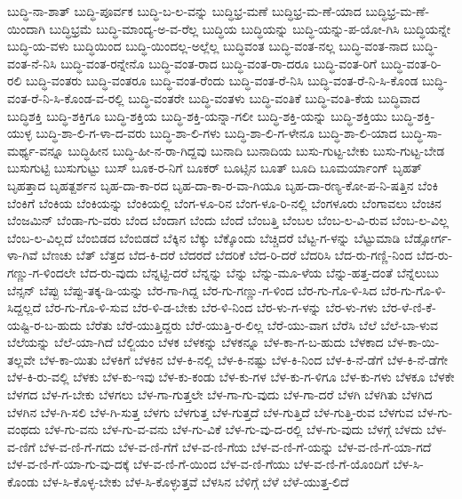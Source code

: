 {ಬುದ್ಧಿ-ನಾ-ಶಾತ್
ಬುದ್ಧಿ-ಪೂರ್ವಕ
ಬುದ್ಧಿ-ಬ-ಲ-ವನ್ನು
ಬುದ್ಧಿಭ್ರ-ಮಣೆ
ಬುದ್ಧಿಭ್ರ-ಮ-ಣೆ-ಯಾದ
ಬುದ್ಧಿಭ್ರ-ಮ-ಣೆ-ಯಿಂದಾಗಿ
ಬುದ್ಧಿಭ್ರಮೆ
ಬುದ್ಧಿ-ಮಾಂದ್ಯ-ಅ-ವ-ರೆಲ್ಲ
ಬುದ್ಧಿಯ
ಬುದ್ಧಿಯನ್ನು
ಬುದ್ಧಿ-ಯನ್ನು-ಪ-ಯೋ-ಗಿಸಿ
ಬುದ್ಧಿಯನ್ನೇ
ಬುದ್ಧಿ-ಯ-ವಳು
ಬುದ್ಧಿಯಿಂದ
ಬುದ್ಧಿ-ಯಿಂದಲ್ಲ-ಅಲ್ಲೆಲ್ಲ
ಬುದ್ಧಿವಂತ
ಬುದ್ಧಿ-ವಂತ-ನಲ್ಲ
ಬುದ್ಧಿ-ವಂತ-ನಾದ
ಬುದ್ಧಿ-ವಂತ-ನೆ-ನಿಸಿ
ಬುದ್ಧಿ-ವಂತ-ರನ್ನೇನೊ
ಬುದ್ಧಿ-ವಂತ-ರಾದ
ಬುದ್ಧಿ-ವಂತ-ರಾ-ದರೂ
ಬುದ್ಧಿ-ವಂತ-ರಿಗೆ
ಬುದ್ಧಿ-ವಂತ-ರಿ-ರಲಿ
ಬುದ್ಧಿ-ವಂತರು
ಬುದ್ಧಿ-ವಂತರೂ
ಬುದ್ಧಿ-ವಂತ-ರೆಂದು
ಬುದ್ಧಿ-ವಂತ-ರೆ-ನಿಸಿ
ಬುದ್ಧಿ-ವಂತ-ರೆ-ನಿ-ಸಿ-ಕೊಂಡ
ಬುದ್ಧಿ-ವಂತ-ರೆ-ನಿ-ಸಿ-ಕೊಂಡ-ವ-ರಲ್ಲಿ
ಬುದ್ಧಿ-ವಂತರೇ
ಬುದ್ಧಿ-ವಂತಳು
ಬುದ್ಧಿ-ವಂತಿಕೆ
ಬುದ್ಧಿ-ವಂತಿ-ಕೆಯ
ಬುದ್ಧಿವಾದ
ಬುದ್ಧಿಶಕ್ತಿ
ಬುದ್ಧಿ-ಶಕ್ತಿಗೂ
ಬುದ್ಧಿ-ಶಕ್ತಿಯ
ಬುದ್ಧಿ-ಶಕ್ತಿ-ಯನ್ನಾ-ಗಲೀ
ಬುದ್ಧಿ-ಶಕ್ತಿ-ಯನ್ನು
ಬುದ್ಧಿ-ಶಕ್ತಿಯು
ಬುದ್ಧಿ-ಶಕ್ತಿ-ಯುಳ್ಳ
ಬುದ್ಧಿ-ಶಾ-ಲಿ-ಗ-ಳಾ-ದ-ವರು
ಬುದ್ಧಿ-ಶಾ-ಲಿ-ಗಳು
ಬುದ್ಧಿ-ಶಾ-ಲಿ-ಗ-ಳೇನೂ
ಬುದ್ಧಿ-ಶಾ-ಲಿ-ಯಾದ
ಬುದ್ಧಿ-ಸಾ-ಮರ್ಥ್ಯ-ವನ್ನೂ
ಬುದ್ಧಿಹೀನ
ಬುದ್ಧಿ-ಹೀ-ನ-ರಾ-ಗಿದ್ದವು
ಬುನಾದಿ
ಬುನಾದಿಯ
ಬುಸು-ಗುಟ್ಟ-ಬೇಕು
ಬುಸು-ಗುಟ್ಟ-ಬೇಡ
ಬುಸುಗುಟ್ಟಿ
ಬುಸುಗುಟ್ಟು
ಬುಸ್
ಬೂಕ-ರ-ನಿಗೆ
ಬೂಕರ್
ಬೂಟ್ಸಿನ
ಬೂತ್
ಬೂದಿ
ಬೂಮರ್ಯಾಂಗ್
ಬೃಹತ್
ಬೃಹತ್ತಾದ
ಬೃಹತ್ದರ್ಶನ
ಬೃಹ-ದಾ-ಕಾ-ರದ
ಬೃಹ-ದಾ-ಕಾ-ರ-ವಾ-ಗಿಯೂ
ಬೃಹ-ದಾ-ರಣ್ಯ-ಕೋ-ಪ-ನಿ-ಷತ್ತಿನ
ಬೆಂಕಿ
ಬೆಂಕಿಗೆ
ಬೆಂಕಿಯ
ಬೆಂಕಿಯನ್ನು
ಬೆಂಕಿಯಲ್ಲಿ
ಬೆಂಗ-ಳೂ-ರಿನ
ಬೆಂಗ-ಳೂ-ರಿ-ನಲ್ಲಿ
ಬೆಂಗಳೂರು
ಬೆಂಗಾವಲು
ಬೆಂಚಿನ
ಬೆಂಜಮಿನ್
ಬೆಂಡಾ-ಗು-ವರು
ಬೆಂದ
ಬೆಂದಾಗ
ಬೆಂದು
ಬೆಂದೆ
ಬೆಂಬತ್ತಿ
ಬೆಂಬಲ
ಬೆಂಬ-ಲ-ವಿ-ರುವ
ಬೆಂಬ-ಲ-ವಿಲ್ಲ
ಬೆಂಬ-ಲ-ವಿಲ್ಲದೆ
ಬೆಂಬಿಡದ
ಬೆಂಬಿಡದೆ
ಬೆಕ್ಕಿನ
ಬೆಕ್ಕು
ಬೆಕ್ಕೊಂದು
ಬೆಚ್ಚಿದರೆ
ಬೆಟ್ಟ-ಗ-ಳನ್ನು
ಬೆಟ್ಟುಮಾಡಿ
ಬೆಡ್ಸೋರ್ಗ-ಳಾ-ಗಿವೆ
ಬೆಣಚು
ಬೆತ್
ಬೆತ್ತದ
ಬೆದ-ಕಿ-ದರೆ
ಬೆದರದೆ
ಬೆದರಿಕೆ
ಬೆದ-ರಿ-ದರೆ
ಬೆದರಿಸಿ
ಬೆದ-ರು-ಗಣ್ಣಿ-ನಿಂದ
ಬೆದ-ರು-ಗಣ್ಣು-ಗ-ಳಿಂದಲೇ
ಬೆದ-ರು-ವುದು
ಬೆನ್ನಟ್ಟಿ-ದರೆ
ಬೆನ್ನನ್ನು
ಬೆನ್ನು
ಬೆನ್ನು-ಮೂ-ಳೆಯ
ಬೆನ್ನು-ಹತ್ತ-ದಂತೆ
ಬೆನ್ನೆಲುಬು
ಬೆನ್ಸನ್
ಬೆಪ್ಪು
ಬೆಪ್ಪು-ತಕ್ಕ-ಡಿ-ಯನ್ನು
ಬೆರ-ಗಾ-ಗಿದ್ದ
ಬೆರ-ಗು-ಗಣ್ಣು-ಗ-ಳಿಂದ
ಬೆರ-ಗು-ಗೊ-ಳಿ-ಸಿದ
ಬೆರ-ಗು-ಗೊ-ಳಿ-ಸಿದ್ದಲ್ಲದೆ
ಬೆರ-ಗು-ಗೊ-ಳಿ-ಸುವ
ಬೆರ-ಳಿ-ಡ-ಬೇಕು
ಬೆರ-ಳಿ-ನಿಂದ
ಬೆರ-ಳು-ಗ-ಳನ್ನು
ಬೆರ-ಳು-ಗಳು
ಬೆರ-ಳೆ-ಣಿ-ಕೆ-ಯಷ್ಟಿ-ರ-ಬ-ಹುದು
ಬೆರೆತು
ಬೆರೆ-ಯುತ್ತಿದ್ದರು
ಬೆರೆ-ಯುತ್ತಿ-ರ-ಲಿಲ್ಲ
ಬೆರೆ-ಯು-ವಾಗ
ಬೆರೆಸಿ
ಬೆಲೆ
ಬೆಲೆ-ಬಾ-ಳುವ
ಬೆಲೆಯನ್ನು
ಬೆಲೆ-ಯಾ-ಗಿದೆ
ಬೆಲ್ಜಿಯಂ
ಬೆಳಕ
ಬೆಳಕನ್ನು
ಬೆಳಕನ್ನೂ
ಬೆಳ-ಕಾ-ಗ-ಬ-ಹುದು
ಬೆಳಕಾದ
ಬೆಳ-ಕಾ-ಯಿ-ತಲ್ಲವೇ
ಬೆಳ-ಕಾ-ಯಿತು
ಬೆಳಕಿಗೆ
ಬೆಳಕಿನ
ಬೆಳ-ಕಿ-ನಲ್ಲಿ
ಬೆಳ-ಕಿ-ನಷ್ಟು
ಬೆಳ-ಕಿ-ನಿಂದ
ಬೆಳ-ಕಿ-ನೆ-ಡೆಗೆ
ಬೆಳ-ಕಿ-ನೆ-ಡೆಗೇ
ಬೆಳ-ಕಿ-ರು-ವಲ್ಲಿ
ಬೆಳಕು
ಬೆಳ-ಕು-ಇವು
ಬೆಳ-ಕು-ಕಂಡು
ಬೆಳ-ಕು-ಗಳ
ಬೆಳ-ಕು-ಗ-ಳಿಗೂ
ಬೆಳ-ಕು-ಗಳು
ಬೆಳಕೂ
ಬೆಳಕೇ
ಬೆಳಗದ
ಬೆಳ-ಗ-ಬೇಕು
ಬೆಳಗಲು
ಬೆಳ-ಗಾ-ಗುತ್ತಲೇ
ಬೆಳ-ಗಾ-ಗು-ವುದು
ಬೆಳ-ಗಾ-ದರೆ
ಬೆಳಗಿ
ಬೆಳಗಿತು
ಬೆಳಗಿದ
ಬೆಳಗಿನ
ಬೆಳ-ಗಿ-ಸಲಿ
ಬೆಳ-ಗಿ-ಸುತ್ತ
ಬೆಳಗು
ಬೆಳಗುತ್ತ
ಬೆಳ-ಗುತ್ತದೆ
ಬೆಳ-ಗುತ್ತಿದೆ
ಬೆಳ-ಗುತ್ತಿ-ರುವ
ಬೆಳಗುವ
ಬೆಳ-ಗು-ವಂಥದು
ಬೆಳ-ಗು-ವನು
ಬೆಳ-ಗು-ವ-ವನು
ಬೆಳ-ಗು-ವಿಕೆ
ಬೆಳ-ಗು-ವು-ದ-ರಲ್ಲಿ
ಬೆಳ-ಗು-ವುದು
ಬೆಳಗ್ಗೆ
ಬೆಳದು
ಬೆಳ-ವ-ಣಿಗೆ
ಬೆಳ-ವ-ಣಿ-ಗೆ-ಗದು
ಬೆಳ-ವ-ಣಿ-ಗೆಗೆ
ಬೆಳ-ವ-ಣಿ-ಗೆಯ
ಬೆಳ-ವ-ಣಿ-ಗೆ-ಯನ್ನು
ಬೆಳ-ವ-ಣಿ-ಗೆ-ಯಾ-ಗದೆ
ಬೆಳ-ವ-ಣಿ-ಗೆ-ಯಾ-ಗು-ವು-ದಕ್ಕೆ
ಬೆಳ-ವ-ಣಿ-ಗೆ-ಯಿಂದ
ಬೆಳ-ವ-ಣಿ-ಗೆಯು
ಬೆಳ-ವ-ಣಿ-ಗೆ-ಯೊಂದಿಗೆ
ಬೆಳ-ಸಿ-ಕೊಂಡು
ಬೆಳ-ಸಿ-ಕೊಳ್ಳ-ಬೇಕು
ಬೆಳ-ಸಿ-ಕೊಳ್ಳುತ್ತವೆ
ಬೆಳಸಿನ
ಬೆಳಿಗ್ಗೆ
ಬೆಳೆ
ಬೆಳೆ-ಯುತ್ತ-ಲಿದೆ
}
